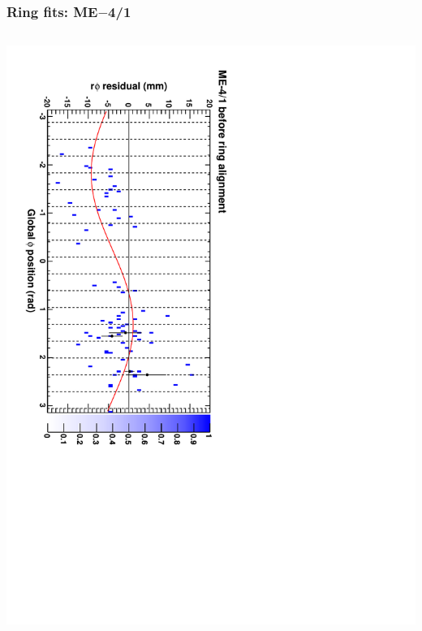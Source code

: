 \documentclass[compress]{beamer}
\begin{document}
\begin{frame}
\frametitle{Ring fits: ME$-$4/1}
\vfill
\begin{columns}
\includegraphics[height=\linewidth, angle=90]{ringfits_before/mem41.pdf}


\end{columns}
\end{frame}
\end{document}
